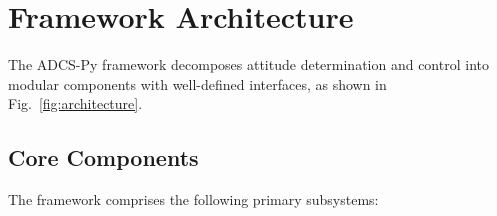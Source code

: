 \documentclass[conference]{IEEEtran}
\begin{document}
\section{Framework Architecture}\label{sec:architecture}

The ADCS-Py framework decomposes attitude determination and control into modular components with well-defined interfaces, as shown in Fig.~\ref{fig:architecture}.


\subsection{Core Components}\label{subsec:components}

The framework comprises the following primary subsystems:
\end{document}
